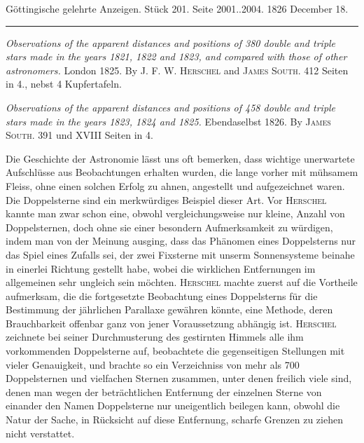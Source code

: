 \clearpage
{}
\hypertarget{native-647-lower}{}
\begin{center}\small Göttingische gelehrte Anzeigen. Stück 201. Seite 2001..2004. 1826 December 18.\\[3pt]\rule{.72\linewidth}{.3pt}\end{center}

\emph{Observations of the apparent distances and positions of \textup{380} double and triple stars made in the years \textup{1821}, \textup{1822} and \textup{1823}, and compared with those of other astronomers.} London 1825. By \textsc{J. F. W. Herschel} and \textsc{James South}. 412 Seiten in 4., nebst 4 Kupfertafeln.

\emph{Observations of the apparent distances and positions of \textup{458} double and triple stars made in the years \textup{1823}, \textup{1824} and \textup{1825}.} Ebendaselbst 1826. By \textsc{James South}. 391 und XVIII Seiten in 4.

Die Geschichte der Astronomie lässt uns oft bemerken, dass wichtige unerwartete Aufschlüsse aus Beobachtungen erhalten wurden, die lange vorher mit mühsamem Fleiss, ohne einen solchen Erfolg zu ahnen, angestellt und aufgezeichnet waren. Die Doppelsterne sind ein merkwürdiges Beispiel dieser Art. Vor \textsc{Herschel} kannte man zwar schon eine, obwohl vergleichungsweise nur kleine, Anzahl von Doppelsternen, doch ohne sie einer besondern Aufmerksamkeit zu würdigen, indem man von der Meinung ausging, dass das Phänomen eines Doppelsterns nur das Spiel eines Zufalls sei, der zwei Fixsterne mit unserm Sonnensysteme beinahe in einerlei Richtung gestellt habe, wobei die wirklichen Entfernungen im allgemeinen sehr ungleich sein möchten. \textsc{Herschel} machte zuerst auf die Vortheile aufmerksam, die die fortgesetzte Beobachtung eines Doppelsterns für die Bestimmung der jährlichen Parallaxe gewähren könnte, eine Methode, deren Brauchbarkeit offenbar ganz von jener Voraussetzung abhängig ist. \textsc{Herschel} zeichnete bei seiner Durchmusterung des gestirnten Himmels alle ihm vorkommenden Doppelsterne auf, beobachtete die gegenseitigen Stellungen mit vieler Genauigkeit, und brachte so ein Verzeichniss von mehr als 700 Doppelsternen und vielfachen Sternen zusammen, unter denen freilich viele sind, denen man wegen der beträchtlichen Entfernung der einzelnen Sterne von einander den Namen Doppelsterne nur uneigentlich beilegen kann, obwohl die Natur der Sache, in Rücksicht auf diese Entfernung, scharfe Grenzen zu ziehen nicht verstattet.

